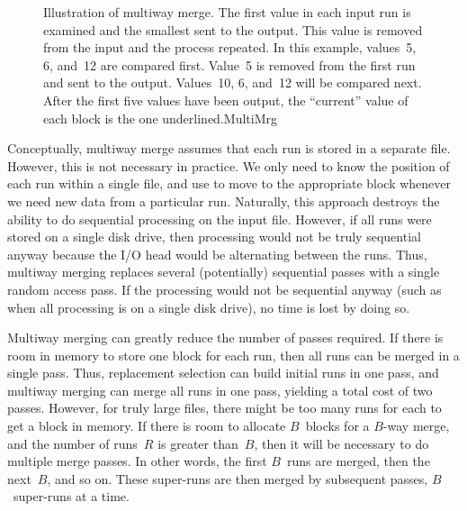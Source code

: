 \begin{figure}
\vspace{1pt}

{Illustration of multiway merge.
The first value in each input run is examined and the smallest sent to
the output.
This value is removed from the input and the process repeated.
In this example, values~5, 6, and~12 are compared first.
Value~5  is removed from the first run and sent to the output.
Values~10, 6, and~12 will be compared next.
After the first five values have been output, the ``current'' value of
each block is the one underlined.}{MultiMrg}
\bigskip
\end{figure}

Conceptually, multiway merge assumes that each run is stored in a
separate file.
However, this is not necessary in practice.
We only need to know the position of each run within a single file,
and use
 to move to the appropriate
block whenever we need new data from a particular run.
Naturally, this approach destroys the ability to do sequential
processing on the input file.
However, if all runs were stored on a single disk drive,
then processing would not be truly sequential anyway because the
I/O head would be alternating between the runs.
Thus, multiway merging replaces several (potentially) sequential
passes with a single random access pass.
If the processing would not be sequential anyway (such as when all
processing is on a single disk drive), no time is lost by doing so.

Multiway merging can greatly reduce the number of passes required.
If there is room in memory to store one block for each run, then all
runs can be merged in a single pass.
Thus, replacement selection can build
initial runs in one pass, and multiway merging can merge all runs in
one pass, yielding a total cost of two passes.
However, for truly large files, there might be too many runs for each
to get a block in memory.
If there is room to allocate \(B\)~blocks for a \(B\)-way merge, and
the number of runs~\(R\) is greater than~\(B\), then it will be
necessary to do multiple merge passes.
In other words, the first \(B\)~runs are merged, then the next~\(B\),
and so on.
These super-runs are then merged by subsequent passes,
\(B\)~super-runs at a time.



